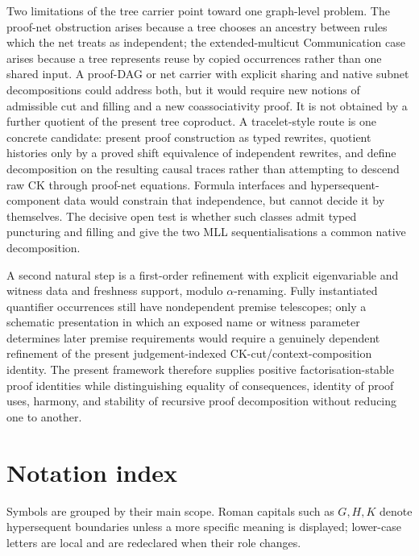 \documentclass[10pt,a4paper]{article}
\theoremstyle{plain}
\theoremstyle{definition}
\theoremstyle{remark}
\begin{document}
Two limitations of the tree carrier point toward one graph-level problem.
The proof-net obstruction arises because a tree chooses an ancestry between
rules which the net treats as independent; the extended-multicut
Communication case arises because a tree represents reuse by copied
occurrences rather than one shared input.  A proof-DAG or net carrier with
explicit sharing and native subnet decompositions could address both, but it
would require new notions of admissible cut and filling and a new
coassociativity proof.  It is not obtained by a further quotient of the
present tree coproduct.  A tracelet-style route
\cite{behrkock2022} is one concrete candidate:
present proof construction as typed rewrites, quotient histories only by a
proved shift equivalence of independent rewrites, and define decomposition
on the resulting causal traces rather than attempting to descend raw CK
through proof-net equations.  Formula interfaces and hypersequent-component
data would constrain that independence, but cannot decide it by themselves.
The decisive open test is whether such classes admit typed puncturing and
filling and give the two MLL sequentialisations a common native
decomposition.

A second natural step is a first-order
refinement with explicit eigenvariable and witness data and freshness
support, modulo \(\alpha\)-renaming.  Fully instantiated quantifier
occurrences still have nondependent premise telescopes; only a schematic
presentation in which an exposed name or witness parameter determines
later premise requirements would require a genuinely dependent refinement
of the present judgement-indexed CK-cut/context-composition identity.  The
present framework
therefore supplies positive factorisation-stable proof identities while
distinguishing equality of consequences, identity of proof uses, harmony,
and stability of recursive proof decomposition without reducing one to
another.

\clearpage
\section*{Notation index}

Symbols are grouped by their main scope.  Roman capitals such as \(G,H,K\)
denote hypersequent boundaries unless a more specific meaning is displayed;
lower-case letters are local and are redeclared when their role changes.
\end{document}

